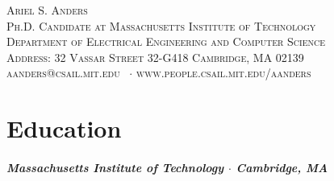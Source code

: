\documentclass[10pt,letterpaper]{article}
\newcommand{\namestyle}{\Huge \scshape}
\newcommand{\deptstyle}{\footnotesize \rmfamily \scshape}
\newcommand{\addressstyle}{\footnotesize \rmfamily \upshape}
\begin{document}
\pagebreak
\fi
\begin{center}
\namestyle Ariel S. Anders \\[0.3em]
\deptstyle Ph.D. Candidate  at  Massachusetts Institute of Technology \\Department of Electrical Engineering and Computer Science\\[0.2em]
\addressstyle Address: 32 Vassar Street 32-G418 Cambridge, MA 02139\\
    aanders@csail.mit.edu \ $\cdot$ www.people.csail.mit.edu/aanders
\end{center}

\section*{Education}
 \subparagraph{Massachusetts Institute of Technology $\cdot$ Cambridge, MA}
\end{document}
